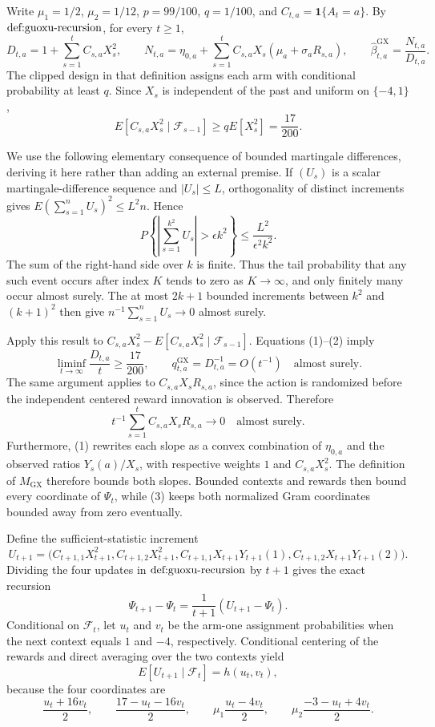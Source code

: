 Write \(\mu_1=1/2\), \(\mu_2=1/12\), \(p=99/100\), \(q=1/100\), and \(C_{t,a}=\mathbf 1\{A_t=a\}\). By \(\textnormal{def:guoxu-recursion}\), for every \(t\geq1\),
\[
 D_{t,a}=1+\sum_{s=1}^tC_{s,a}X_s^2,\qquad
 N_{t,a}=\eta_{0,a}+\sum_{s=1}^tC_{s,a}X_s(\mu_a+\sigma_aR_{s,a}),
 \qquad \widehat\beta^{\mathrm{GX}}_{t,a}=\frac{N_{t,a}}{D_{t,a}}. \tag{1}
\]
The clipped design in that definition assigns each arm with conditional probability at least \(q\). Since \(X_s\) is independent of the past and uniform on \(\{-4,1\}\),
\[
 E[C_{s,a}X_s^2\mid\mathcal F_{s-1}]
 \ge qE[X_s^2]=\frac{17}{200}. \tag{2}
\]

We use the following elementary consequence of bounded martingale differences, deriving it here rather than adding an external premise. If \((U_s)\) is a scalar martingale-difference sequence and \(|U_s|\le L\), orthogonality of distinct increments gives \(E(\sum_{s=1}^nU_s)^2\le L^2n\). Hence
\[
 P\left\{\left|\sum_{s=1}^{k^2}U_s\right|>\epsilon k^2\right\}
 \le \frac{L^2}{\epsilon^2k^2}.
\]
The sum of the right-hand side over \(k\) is finite. Thus the tail probability that any such event occurs after index \(K\) tends to zero as \(K\to\infty\), and only finitely many occur almost surely. The at most \(2k+1\) bounded increments between \(k^2\) and \((k+1)^2\) then give \(n^{-1}\sum_{s=1}^nU_s\to0\) almost surely.

Apply this result to \(C_{s,a}X_s^2-E[C_{s,a}X_s^2\mid\mathcal F_{s-1}]\). Equations (1)--(2) imply
\[
 \liminf_{t\to\infty}\frac{D_{t,a}}t\ge\frac{17}{200},
 \qquad q^{\mathrm{GX}}_{t,a}=D_{t,a}^{-1}=O(t^{-1})
 \quad\text{almost surely}. \tag{3}
\]
The same argument applies to \(C_{s,a}X_sR_{s,a}\), since the action is randomized before the independent centered reward innovation is observed. Therefore
\[
 t^{-1}\sum_{s=1}^tC_{s,a}X_sR_{s,a}\longrightarrow0
 \quad\text{almost surely}. \tag{4}
\]
Furthermore, (1) rewrites each slope as a convex combination of \(\eta_{0,a}\) and the observed ratios \(Y_s(a)/X_s\), with respective weights \(1\) and \(C_{s,a}X_s^2\). The definition of \(M_{\mathrm{GX}}\) therefore bounds both slopes. Bounded contexts and rewards then bound every coordinate of \(\Psi_t\), while (3) keeps both normalized Gram coordinates bounded away from zero eventually.

Define the sufficient-statistic increment
\[
 U_{t+1}=\bigl(C_{t+1,1}X_{t+1}^2,C_{t+1,2}X_{t+1}^2,
 C_{t+1,1}X_{t+1}Y_{t+1}(1),C_{t+1,2}X_{t+1}Y_{t+1}(2)\bigr).
\]
Dividing the four updates in \(\textnormal{def:guoxu-recursion}\) by \(t+1\) gives the exact recursion
\[
 \Psi_{t+1}-\Psi_t=\frac1{t+1}(U_{t+1}-\Psi_t). \tag{5}
\]
Conditional on \(\mathcal F_t\), let \(u_t\) and \(v_t\) be the arm-one assignment probabilities when the next context equals \(1\) and \(-4\), respectively. Conditional centering of the rewards and direct averaging over the two contexts yield
\[
 E[U_{t+1}\mid\mathcal F_t]=h(u_t,v_t), \tag{6}
\]
because the four coordinates are
\[
 \frac{u_t+16v_t}{2},\qquad \frac{17-u_t-16v_t}{2},\qquad
 \mu_1\frac{u_t-4v_t}{2},\qquad
 \mu_2\frac{-3-u_t+4v_t}{2}.
\]

